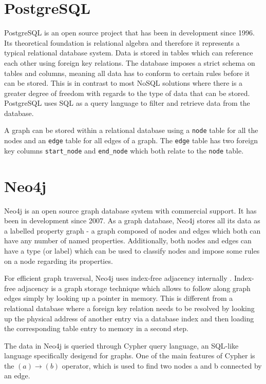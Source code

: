 \documentclass[11pt, a4paper,oneside,chapterprefix=false]{scrbook}
\begin{document}
\section{PostgreSQL}
PostgreSQL \cite{postgres} is an open source project that has been in development since 1996.
Its theoretical foundation is relational algebra \cite{relationalalgebra} and therefore it represents a typical relational database system.
Data is stored in tables which can reference each other using foreign key relations.
The database imposes a strict schema on tables and columns, meaning all data has to conform to certain rules before it can be stored.
This is in contrast to most NoSQL solutions where there is a greater degree of freedom with regards to the type of data that can be stored.
PostgreSQL uses SQL as a query language to filter and retrieve data from the database.

A graph can be stored within a relational database using a \lstinline{node} table for all the nodes and an \lstinline{edge} table for all edges of a graph. 
The \lstinline{edge} table has two foreign key columns \lstinline{start_node} and \lstinline{end_node} which both relate to the \lstinline{node} table.

\section{Neo4j}
Neo4j \cite{neo4j} is an open source graph database system with commercial support.
It has been in development since 2007.
As a graph database, Neo4j stores all its data as a labelled property graph - a graph composed of nodes and edges which both can have any number of named properties.
Additionally, both nodes and edges can have a type (or label) which can be used to classify nodes and impose some rules on a node regarding its properties.

For efficient graph traversal, Neo4j uses index-free adjacency internally \cite{neo4jinaction:chapter11}.
Index-free adjacency is a graph storage technique which allows to follow along graph edges simply by looking up a pointer in memory.
This is different from a relational database where a foreign key relation needs to be resolved by looking up the physical address of another entry via a database index and then loading the corresponding table entry to memory in a second step.

The data in Neo4j is queried through Cypher query language, an SQL-like language specifically desigend for graphs.
One of the main features of Cypher is the $(a)\rightarrow(b)$ operator, which is used to find two nodes a and b connected by an edge.
\end{document}
